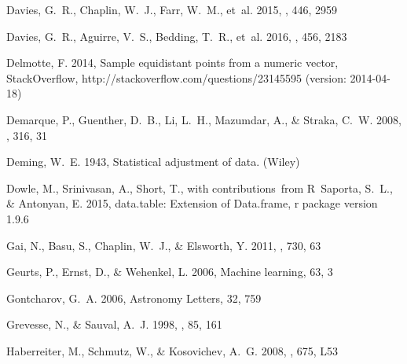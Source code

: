 \documentclass[manuscript,linenumbers]{aastex6}
\begin{document}
\begin{thebibliography}{}
{Davies}, G.~R., {Chaplin}, W.~J., {Farr}, W.~M., {et~al.} 2015, \mnras, 446,
  2959

{Davies}, G.~R., {Aguirre}, V.~S., {Bedding}, T.~R., {et~al.} 2016, \mnras,
  456, 2183

Delmotte, F. 2014, Sample equidistant points from a numeric vector,
  StackOverflow, http://stackoverflow.com/questions/23145595 (version:
  2014-04-18)

{Demarque}, P., {Guenther}, D.~B., {Li}, L.~H., {Mazumdar}, A., \& {Straka},
  C.~W. 2008, \apss, 316, 31

Deming, W.~E. 1943, Statistical adjustment of data. (Wiley)

Dowle, M., Srinivasan, A., Short, T., with contributions~from R~Saporta, S.~L.,
  \& Antonyan, E. 2015, data.table: Extension of Data.frame, r package version
  1.9.6

{Gai}, N., {Basu}, S., {Chaplin}, W.~J., \& {Elsworth}, Y. 2011, \apj, 730, 63

Geurts, P., Ernst, D., \& Wehenkel, L. 2006, Machine learning, 63, 3

{Gontcharov}, G.~A. 2006, Astronomy Letters, 32, 759

{Grevesse}, N., \& {Sauval}, A.~J. 1998, \ssr, 85, 161

{Haberreiter}, M., {Schmutz}, W., \& {Kosovichev}, A.~G. 2008, \apjl, 675, L53


\end{thebibliography}
\end{document}
